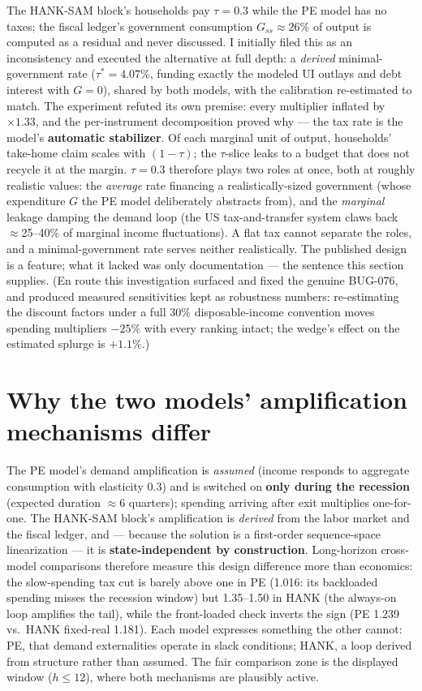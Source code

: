 \documentclass[11pt]{article}
\begin{document}
The HANK-SAM block's households pay $\tau=0.3$ while the PE model has no
taxes; the fiscal ledger's government consumption $G_{ss}\approx 26\%$
of output is computed as a residual and never discussed. I initially
filed this as an inconsistency and executed the alternative at full
depth: a \emph{derived} minimal-government rate ($\tau^{*}=4.07\%$,
funding exactly the modeled UI outlays and debt interest with $G=0$),
shared by both models, with the calibration re-estimated to match. The
experiment refuted its own premise: every multiplier inflated by
$\times 1.33$, and the per-instrument decomposition proved why --- the
tax rate is the model's \textbf{automatic stabilizer}. Of each marginal
unit of output, households' take-home claim scales with $(1-\tau)$; the
$\tau$-slice leaks to a budget that does not recycle it at the margin.
$\tau=0.3$ therefore plays two roles at once, both at roughly realistic
values: the \emph{average} rate financing a realistically-sized
government (whose expenditure $G$ the PE model deliberately abstracts
from), and the \emph{marginal} leakage damping the demand loop (the US
tax-and-transfer system claws back $\approx$25--40\% of marginal income
fluctuations). A flat tax cannot separate the roles, and a
minimal-government rate serves neither realistically. The published
design is a feature; what it lacked was only documentation --- the
sentence this section supplies. (En route this investigation surfaced
and fixed the genuine BUG-076, and produced measured sensitivities kept
as robustness numbers: re-estimating the discount factors under a full
30\% disposable-income convention moves spending multipliers $-25\%$
with every ranking intact; the wedge's effect on the estimated splurge
is $+1.1\%$.)

\section{Why the two models' amplification mechanisms differ}
\label{sec:window}

The PE model's demand amplification is \emph{assumed} (income responds
to aggregate consumption with elasticity 0.3) and is switched on
\textbf{only during the recession} (expected duration $\approx$6
quarters); spending arriving after exit multiplies one-for-one. The
HANK-SAM block's amplification is \emph{derived} from the labor market
and the fiscal ledger, and --- because the solution is a first-order
sequence-space linearization --- it is \textbf{state-independent by
construction}. Long-horizon cross-model comparisons therefore measure
this design difference more than economics: the slow-spending tax cut
is barely above one in PE (1.016: its backloaded spending misses the
recession window) but 1.35--1.50 in HANK (the always-on loop amplifies
the tail), while the front-loaded check inverts the sign (PE 1.239
vs.\ HANK fixed-real 1.181). Each model expresses something the other
cannot: PE, that demand externalities operate in slack conditions;
HANK, a loop derived from structure rather than assumed. The fair
comparison zone is the displayed window ($h\le12$), where both
mechanisms are plausibly active.
\end{document}
